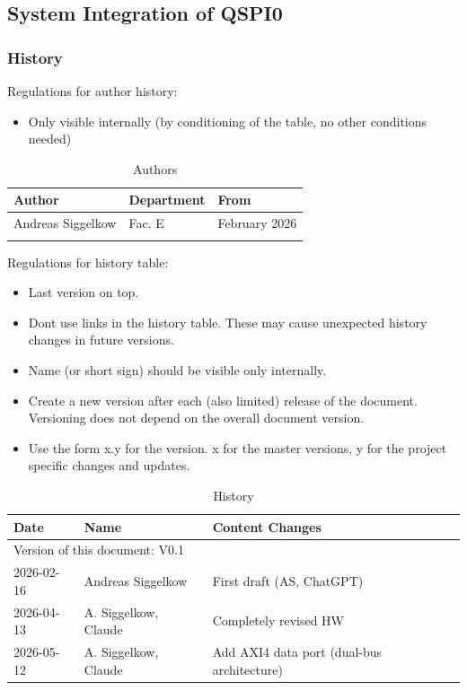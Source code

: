 
\label{sec:qspifunc01}

\subsection{System Integration of QSPI0}
\subsubsection{History}
Regulations for author history:
\begin{itemize}
  \item Only visible internally (by conditioning of the table, no other conditions needed)
\end{itemize}

\begin{table}[H]
\caption{Authors}
\label{tab:qspiauth01a}
\centering
\begin{tabularx}{\textwidth}{|X |X |X |}
  \hline
  Author & Department & From \\
  \hline
  \hline
  Andreas Siggelkow & Fac. E & February 2026 \\
  \hline
  && \\
  \hline
\end{tabularx}
\end{table}

Regulations for history table:
\begin{itemize}
  \item Last version on top.
  \item Dont use links in the history table. These may cause unexpected history changes in future versions.
  \item Name (or short sign) should be visible only internally.
  \item Create a new version after each (also limited) release of the document. Versioning does not depend on the overall document version.
  \item Use the form x.y for the version. x for the master versions, y for the project specific changes and updates.
\end{itemize}

\begin{table}[H]
\caption{History}
\label{tab:qspihistory01a}
\centering
\begin{tabularx}{\textwidth}{|X |X |X |}
  \hline
  Date & Name & Content Changes \\
  \hline
  \multicolumn{3}{|l|}{Version of this document: V0.1} \\
  \hline
  2026-02-16 & Andreas Siggelkow & First draft (AS, ChatGPT) \\
  \hline
  2026-04-13 & A. Siggelkow, Claude & Completely revised HW \\
  \hline
  2026-05-12 & A. Siggelkow, Claude & Add AXI4 data port (dual-bus architecture) \\
  \hline
\end{tabularx}
\end{table}

